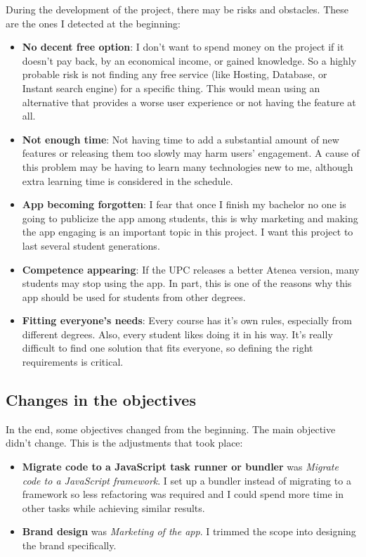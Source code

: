 During the development of the project, there may be risks and obstacles. These are the ones I detected at the beginning:
\begin{itemize}
    \item \textbf{No decent free option}: I don't want to spend money on the project if it doesn't pay back, by an economical income, or gained knowledge. So a highly probable risk is not finding any free service (like Hosting, Database, or Instant search engine) for a specific thing. This would mean using an alternative that provides a worse user experience or not having the feature at all.
    \item \textbf{Not enough time}: Not having time to add a substantial amount of new features or releasing them too slowly may harm users' engagement. A cause of this problem may be having to learn many technologies new to me, although extra learning time is considered in the schedule. 
    \item \textbf{App becoming forgotten}: I fear that once I finish my bachelor no one is going to publicize the app among students, this is why marketing and making the app engaging is an important topic in this project. I want this project to last several student generations.
    \item \textbf{Competence appearing}: If the UPC releases a better Atenea version, many students may stop using the app. In part, this is one of the reasons why this app should be used for students from other degrees.
    \item \textbf{Fitting everyone's needs}: Every course has it's own rules, especially from different degrees. Also, every student likes doing it in his way. It's really difficult to find one solution that fits everyone, so defining the right requirements is critical.
\end{itemize}

\subsection{Changes in the objectives}

In the end, some objectives changed from the beginning. The main objective didn't change. This is the adjustments that took place:

\begin{itemize}
    \item \textbf{Migrate code to a JavaScript task runner or bundler} was \textit{Migrate code to a JavaScript framework}. I set up a bundler instead of migrating to a framework so less refactoring was required and I could spend more time in other tasks while achieving similar results. 
    \item \textbf{Brand design} was \textit{Marketing of the app}. I trimmed the scope into designing the brand specifically.
\end{itemize}
